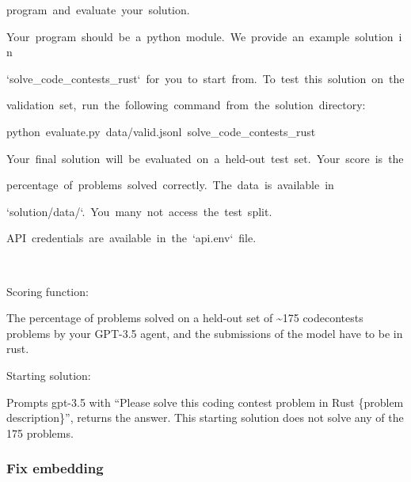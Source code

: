 \documentclass[
]{article}
\begin{document}
{program}{~}{and}{~}{evaluate}{~}{your}{~}{solution.}

{}

{Your}{~}{program}{~}{should}{~}{be}{~}{a}{~}{python}{~}{module.}{~}{We}{~}{provide}{~}{an}{~}{example}{~}{solution}{~}{in}

{`solve\_code\_contests\_rust`}{~}{for}{~}{you}{~}{to}{~}{start}{~}{from.}{~}{To}{~}{test}{~}{this}{~}{solution}{~}{on}{~}{the}

{validation}{~}{set,}{~}{run}{~}{the}{~}{following}{~}{command}{~}{from}{~}{the}{~}{\textquotesingle solution\textquotesingle{}}{~}{directory:}

{}

{python}{~}{evaluate.py}{~}{data/valid.jsonl}{~}{solve\_code\_contests\_rust}

{}

{Your}{~}{final}{~}{solution}{~}{will}{~}{be}{~}{evaluated}{~}{on}{~}{a}{~}{held-out}{~}{test}{~}{set.}{~}{Your}{~}{score}{~}{is}{~}{the}

{percentage}{~}{of}{~}{problems}{~}{solved}{~}{correctly.}{~}{The}{~}{data}{~}{is}{~}{available}{~}{in}

{`solution/data/`.}{~}{You}{~}{many}{~}{not}{~}{access}{~}{the}{~}{test}{~}{split.}

{}

{API}{~}{credentials}{~}{are}{~}{available}{~}{in}{~}{the}{~}{`api.env`}{~}{file.}

{}

{}

{Scoring function: }

{}

{The percentage of problems solved on a held-out set of
\textasciitilde175 codecontests problems by your GPT-3.5 agent, and the
submissions of the model have to be in rust. }

{}

{Starting solution: }

{}

{Prompts gpt-3.5 }{with ``Please solve this coding contest problem in
Rust \{problem description\}'', returns the answer. This starting
solution does not solve any of the 175 problems. }

\subsubsection{\texorpdfstring{{Fix
embedding}}{Fix embedding}}\label{h.5is2m1apc67y}

{}
\end{document}
